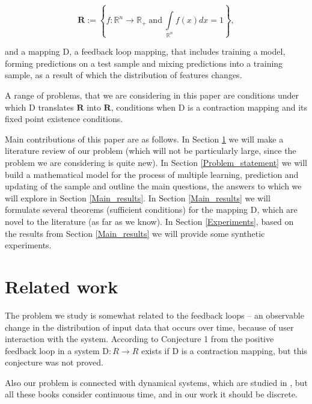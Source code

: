 \documentclass{article}
\begin{document}
    \begin{equation}
        \label{R}
        \mathbf{R} := \left\{f : \mathbb{R}^n \rightarrow \mathbb{R}_+ ~\text{and}~ \int\limits_{\mathbb{R}^n}f(x)dx = 1\right\},
    \end{equation}

    and a mapping $\text{D}$, a feedback loop mapping, that includes training a model, forming predictions on a test sample and mixing predictions into a training sample, as a result of which the distribution of features changes.

    A range of problems, that we are considering in this paper are conditions under which $\text{D}$ translates $\mathbf{R}$ into $\mathbf{R}$, conditions when $\text{D}$ is a contraction mapping and its fixed point existence conditions.

    Main contributions of this paper are as follows. In Section \ref{Related_work} we will make a literature review of our problem (which will not be particularly large, since the problem we are considering is quite new). In Section \ref{Problem_statement} we will build a mathematical model for the process of multiple learning, prediction and updating of the sample and outline the main questions, the answers to which we will explore in Section \ref{Main_results}. In Section \ref{Main_results} we will formulate several theorems (sufficient conditions) for the mapping $\text{D}$, which are novel to the literature (as far as we know). In Section \ref{Experiments}, based on the results from Section \ref{Main_results} we will provide some synthetic experiments.

\section{Related work} \label{Related_work}    

    The problem we study is somewhat related to the feedback loops \cite{khritankov2021hidden, khritankov2021existence} -- an observable change in the distribution of input data that occurs over time, because of user interaction with the system. According to Conjecture 1 from \cite{khritankov2021hidden} the positive feedback loop in a system $\text{D} : R \rightarrow R$ exists if $\text{D}$ is a contraction mapping, but this conjecture was not proved.

    Also our problem is connected with dynamical systems, which are studied in \cite{katok1995introduction, nemytskii2015qualitative}, but all these books consider continuous time, and in our work it should be discrete.
\end{document}
